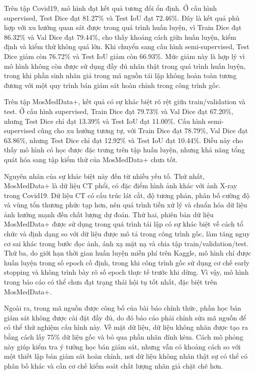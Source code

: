 Trên tập Covid19, mô hình đạt kết quả tương đối ổn định. Ở cấu hình supervised, Test Dice đạt 81.27\% và Test IoU đạt 72.46\%. Đây là kết quả phù hợp với xu hướng quan sát được trong quá trình huấn luyện, vì Train Dice đạt 86.32\% và Val Dice đạt 79.44\%, cho thấy khoảng cách giữa huấn luyện, kiểm định và kiểm thử không quá lớn. Khi chuyển sang cấu hình semi-supervised, Test Dice giảm còn 76.72\% và Test IoU giảm còn 66.93\%. Mức giảm này là hợp lý vì mô hình không còn được sử dụng đầy đủ nhãn thật trong quá trình huấn luyện, trong khi phần sinh nhãn giả trong mã nguồn tái lập không hoàn toàn tương đương với một quy trình bán giám sát hoàn chỉnh trong công trình gốc.

Trên tập MosMedData+, kết quả có sự khác biệt rõ rệt giữa train/validation và test. Ở cấu hình supervised, Train Dice đạt 79.73\% và Val Dice đạt 67.20\%, nhưng Test Dice chỉ đạt 13.39\% và Test IoU đạt 11.00\%. Cấu hình semi-supervised cũng cho xu hướng tương tự, với Train Dice đạt 78.79\%, Val Dice đạt 63.86\%, nhưng Test Dice chỉ đạt 12.92\% và Test IoU đạt 10.44\%. Điều này cho thấy mô hình có học được đặc trưng trên tập huấn luyện, nhưng khả năng tổng quát hóa sang tập kiểm thử của MosMedData+ chưa tốt.

Nguyên nhân của sự khác biệt này đến từ nhiều yếu tố. Thứ nhất, MosMedData+ là dữ liệu CT phổi, có đặc điểm hình ảnh khác với ảnh X-ray trong Covid19. Dữ liệu CT có cấu trúc lát cắt, độ tương phản, phân bố cường độ và vùng tổn thương phức tạp hơn, nên quá trình tiền xử lý và chuẩn hóa dữ liệu ảnh hưởng mạnh đến chất lượng dự đoán. Thứ hai, phiên bản dữ liệu MosMedData+ được sử dụng trong quá trình tái lập có sự khác biệt về cách tổ chức và định dạng so với dữ liệu được mô tả trong công trình gốc, làm tăng nguy cơ sai khác trong bước đọc ảnh, ánh xạ mặt nạ và chia tập train/validation/test. Thứ ba, do giới hạn thời gian huấn luyện miễn phí trên Kaggle, mô hình chỉ được huấn luyện trong số epoch cố định, trong khi công trình gốc sử dụng cơ chế early stopping và không trình bày rõ số epoch thực tế trước khi dừng. Vì vậy, mô hình trong báo cáo có thể chưa đạt trạng thái hội tụ tốt nhất, đặc biệt trên MosMedData+.

Ngoài ra, trong mã nguồn được công bố của bài báo chính thức, phần học bán giám sát không được cài đặt đầy đủ, do đó báo cáo phải chỉnh sửa mã nguồn để có thể thử nghiệm cấu hình này. Về mặt dữ liệu, dữ liệu không nhãn được tạo ra bằng cách lấy 75\% dữ liệu gốc và bỏ qua phần nhãn đính kèm. Cách mô phỏng này giúp kiểm tra ý tưởng học bán giám sát, nhưng vẫn có khoảng cách so với một thiết lập bán giám sát hoàn chỉnh, nơi dữ liệu không nhãn thật sự có thể có phân bố khác và cần cơ chế kiểm soát chất lượng nhãn giả chặt chẽ hơn.

